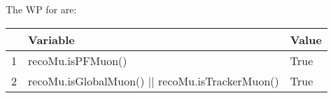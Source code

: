 \footnotesize
The WP for
are:\\

\renewcommand{\arraystretch}{1.0}
\begin{table}
  \begin{center}
    \begin{tabular}{c l l}
      \hline
      & Variable & Value  \\
      \hline
      1 & recoMu.isPFMuon() & True \\
      2 & recoMu.isGlobalMuon() || recoMu.isTrackerMuon() & True \\
      \hline
    \end{tabular}
  \end{center}
\end{table}
\renewcommand{\arraystretch}{1}
